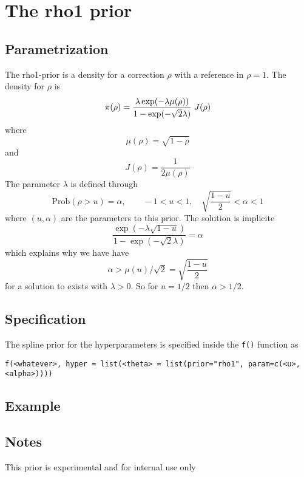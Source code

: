 \documentclass[a4paper,11pt]{article}
\begin{document}
\section*{The rho1 prior}

\subsection*{Parametrization}
The rho1-prior is a density for a correction $\rho$ with a reference
in $\rho=1$. The density for $\rho$ is
\begin{displaymath}
    \pi(\rho) = \frac{\lambda \exp(-\lambda \mu(\rho))}{%
        1-\exp(-\sqrt{2}\lambda)} \; J(\rho)
\end{displaymath}
where
\begin{displaymath}
    \mu(\rho) = \sqrt{1-\rho}
\end{displaymath}
and
\begin{displaymath}
    J(\rho) = \frac{1}{2\mu(\rho)}
\end{displaymath}
The parameter $\lambda$ is defined through
\begin{displaymath}
    \text{Prob}( \rho > u) = \alpha, \qquad -1 < u < 1, \quad
    \sqrt{\frac{1-u}{2}} <\alpha<1
\end{displaymath}
where $(u, \alpha{})$ are the parameters to this prior. The solution
is implicite
\begin{displaymath}
    \frac{\exp(-\lambda \sqrt{1-u})}{1-\exp(-\sqrt{2}\lambda)} = \alpha
\end{displaymath}
which explains why we have have
\begin{displaymath}
    \alpha > \mu(u)/\sqrt{2} = \sqrt{\frac{1-u}{2}}
\end{displaymath}
for a solution to exists with $\lambda > 0$. 
So for $u=1/2$ then $\alpha > 1/2$.
\subsection*{Specification}
The spline prior for the hyperparameters is specified inside the
{\tt f()} function as 
\begin{center}
    {\tt f(<whatever>, hyper = list(<theta> =
        list(prior="rho1", param=c(<u>,<alpha>))))}
\end{center}

\subsection*{Example}

\subsection*{Notes}
This prior is experimental and for internal use only
\end{document}
